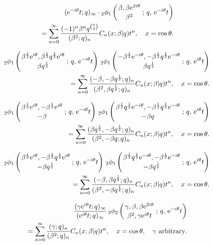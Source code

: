 \documentclass[envcountchap,graybox]{svmono}
\newcommand{\qhyp}[5]{\mbox{}_{#1}{\phi}_{#2}
\left(\genfrac{}{}{0pt}{}{#3}{#4}\,;\,q,\,#5\right)}
\newcommand{\e}{\textrm{e}}
\begin{document}
\begin{eqnarray}
\label{GenContqUltra3}
& &(\e^{-i\theta}t;q)_{\infty}\cdot
\qhyp{2}{1}{\beta,\beta\e^{2i\theta}}{\beta^2}{\e^{-i\theta}t}\nonumber\\
& &{}=\sum_{n=0}^{\infty}\frac{(-1)^n\beta^nq^{\binom{n}{2}}}{(\beta^2;q)_n}C_n(x;\beta|q)t^n,
\quad x=\cos\theta.
\end{eqnarray}

\begin{eqnarray}
\label{GenContqUltra4}
& &\qhyp{2}{1}{\beta^{\frac{1}{2}}\e^{i\theta},
\beta^{\frac{1}{2}}q^{\frac{1}{2}}\e^{i\theta}}{\beta q^{\frac{1}{2}}}{\e^{-i\theta}t}\,
\qhyp{2}{1}{-\beta^{\frac{1}{2}}\e^{-i\theta},
-\beta^{\frac{1}{2}}q^{\frac{1}{2}}\e^{-i\theta}}{\beta q^{\frac{1}{2}}}{\e^{i\theta}t}\nonumber\\
& &{}=\sum_{n=0}^{\infty}\frac{(-\beta,-\beta q^{\frac{1}{2}};q)_n}
{(\beta^2,\beta q^{\frac{1}{2}};q)_n}C_n(x;\beta|q)t^n,\quad x=\cos\theta.
\end{eqnarray}

\begin{eqnarray}
\label{GenContqUltra5}
& &\qhyp{2}{1}{\beta^{\frac{1}{2}}\e^{i\theta},
-\beta^{\frac{1}{2}}\e^{i\theta}}{-\beta}{\e^{-i\theta}t}\,
\qhyp{2}{1}{\beta^{\frac{1}{2}}q^{\frac{1}{2}}\e^{-i\theta},
-\beta^{\frac{1}{2}}q^{\frac{1}{2}}\e^{-i\theta}}{-\beta q}{\e^{i\theta}t}\nonumber\\
& &{}=\sum_{n=0}^{\infty}\frac{(\beta q^{\frac{1}{2}},-\beta q^{\frac{1}{2}};q)_n}
{(\beta^2,-\beta q;q)_n}C_n(x;\beta|q)t^n,\quad x=\cos\theta.
\end{eqnarray}

\begin{eqnarray}
\label{GenContqUltra6}
& &\qhyp{2}{1}{\beta^{\frac{1}{2}}\e^{i\theta},
-\beta^{\frac{1}{2}}q^{\frac{1}{2}}\e^{i\theta}}{-\beta q^{\frac{1}{2}}}{\e^{-i\theta}t}\,
\qhyp{2}{1}{\beta^{\frac{1}{2}}q^{\frac{1}{2}}\e^{-i\theta},
-\beta^{\frac{1}{2}}\e^{-i\theta}}{-\beta q^{\frac{1}{2}}}{\e^{i\theta}t}\nonumber\\
& &{}=\sum_{n=0}^{\infty}\frac{(-\beta,\beta q^{\frac{1}{2}};q)_n}
{(\beta^2,-\beta q^{\frac{1}{2}};q)_n}C_n(x;\beta|q)t^n,\quad x=\cos\theta.
\end{eqnarray}

\begin{eqnarray}
\label{GenContqUltra7}
& &\frac{(\gamma\e^{i\theta}t;q)_{\infty}}{(\e^{i\theta}t;q)_{\infty}}\,
\qhyp{3}{2}{\gamma,\beta,\beta\e^{2i\theta}}{\beta^2,\gamma\e^{i\theta}t}{\e^{-i\theta}t}\nonumber\\
& &{}=\sum_{n=0}^{\infty}\frac{(\gamma;q)_n}{(\beta^2;q)_n}C_n(x;\beta|q)t^n,
\quad x=\cos\theta,\quad\textrm{$\gamma$ arbitrary}.
\end{eqnarray}
\end{document}
